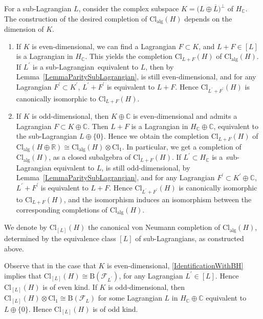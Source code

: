 \documentclass[pdftex]{sigma}
\numberwithin{equation}{section}
\newcommand{\R}{\mathbb{R}}
\newcommand{\C}{\mathbb{C}}
\newcommand{\B}{\mathrm{B}}
\newcommand{\Cl}{\mathrm{Cl}}
\begin{document}
For a sub-Lagrangian $L$, consider the complex subspace $K = \big(L \oplus \overline{L}\big)^\perp$ of $H_\C$.
The construction of the desired completion of $\Cl_{\mathrm{alg}}(H)$ depends on the dimension of $K$.
\begin{enumerate}\itemsep=0pt
\item[(i)] If $K$ is even-dimensional, we can find a Lagrangian $F \subset K$, and $L + F \in [L]$ is a Lagrangian in $H_\C$.
This yields the completion $\Cl_{L+F}(H)$ of $\Cl_{\mathrm{alg}}(H)$.
If $L^\prime$ is a sub-Lagrangian~equivalent to $L$, then by Lemma~\ref{LemmaParitySubLagrangian},  is still even-dimensional, and for any Lagrangian $F^\prime \subset K^\prime$, $L^\prime + F^\prime$ is equivalent to $L+F$.
Hence $\Cl_{L^\prime + F^\prime}(H)$ is canonically isomorphic to $\Cl_{L+F}(H)$.

\item[(ii)] If $K$ is odd-dimensional, then $K \oplus \C$ is even-dimensional and admits a Lagrangian $F \subset K \oplus \C$.
Then $L + F$ is a Lagrangian in $H_\C \oplus \C$, equivalent to the sub-Lagrangian $L \oplus \{0\}$.
Hence we obtain the completion $\Cl_{L+F}(H)$ of $\Cl_{\mathrm{alg}}(H \oplus \R) \cong \Cl_{\mathrm{alg}}(H) \otimes \Cl_1$.
In particular, we get a completion of $\Cl_{\mathrm{alg}}(H)$, as a closed subalgebra of $\Cl_{L+F}(H)$.
If $L^\prime \subset H_\C$ is a~sub-Lagrangian equivalent to $L$,  is still odd-dimensional, by Lemma~\ref{LemmaParitySubLagrangian}, and for any Lagrangian $F^\prime \subset K^\prime \oplus \C$, $L^\prime + F^\prime$ is equivalent to $L+F$.
Hence $\Cl_{L^\prime+F^\prime}(H)$ is canonically isomorphic to $\Cl_{L + F}(H)$, and the isomorphism induces an isomorphism between the corresponding completions of $\Cl_{\mathrm{alg}}(H)$.
\end{enumerate}

We denote by $\Cl_{[L]}(H)$ the canonical von Neumann completion of $\Cl_{\mathrm{alg}}(H)$, determined by the equivalence class $[L]$ of sub-Lagrangians, as constructed above.

Observe that in the case that $K$ is even-dimensional, \eqref{IdentificationWithBH} implies that $\Cl_{[L]}(H) \cong \B(\mathcal{F}_{L^\prime})$, for any Lagrangian $L^\prime \in [L]$.
Hence $\Cl_{[L]}(H)$ is of even kind.
If $K$ is odd-dimensional, then $\Cl_{[L]}(H) \otimes \Cl_1 \cong \B(\mathcal{F}_{L})$ for some Lagrangian $L$ in $H_\C \oplus \C$ equivalent to $L \oplus \{0\}$.
Hence $\Cl_{[L]}(H)$ is of odd kind.
\end{document}
